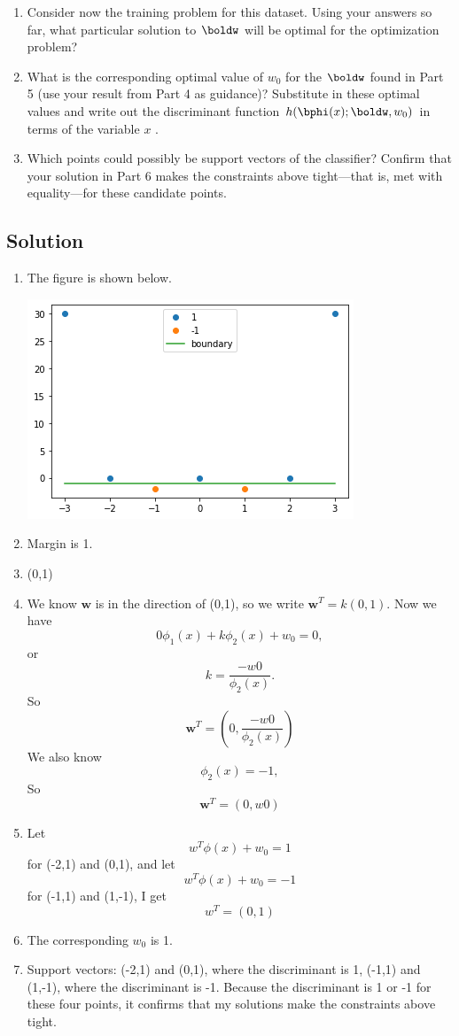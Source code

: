 \documentclass[submit]{harvardml}
\begin{document}
\begin{problem}
\begin{enumerate}
\item Consider now the training problem for this dataset. Using your
  answers so far, what particular solution to $\boldw$ will be optimal
  for the optimization problem?

\item What is the corresponding optimal value of $w_0$ for the
  $\boldw$ found in Part 5 (use your result from Part 4 as guidance)?
  Substitute in these optimal values and write out the discriminant
  function $h(\bphi(x);\boldw,w_0)$ in terms of the variable $x$ .


\item Which points could possibly be support vectors of the classifier?  Confirm that
  your solution in Part 6 makes the constraints above tight---that is,
  met with equality---for these candidate points.

\end{enumerate}

\end{problem}


\newpage
\subsection*{Solution}
\begin{enumerate}
    \item 
    The figure is shown below.
    \begin{center}
    \includegraphics[width=.5\textwidth]{T1_1.png}
    \end{center}
    \item
    Margin is 1.
    \item
    (0,1)
    \item
    We know $\textbf{w}$ is in the direction of (0,1), so we write $\textbf{w}^T=k(0,1)$. Now we have
    $$0\phi_1(x)+k\phi_2(x)+w_0=0,$$
    or
    $$k=\frac{-w0}{\phi_2(x)}.$$
    So 
    $$\textbf{w}^T=(0,\frac{-w0}{\phi_2(x)})$$
    We also know
    $$\phi_2(x)=-1,$$
    So 
    $$\textbf{w}^T=(0,w0)$$
    \item
    Let 
    $${w}^T\phi(x)+w_0=1$$
    for (-2,1) and (0,1), and let
    $${w}^T\phi(x)+w_0=-1$$
    for (-1,1) and (1,-1),
    I get 
    $${w}^T=(0,1)$$
    \item
    The corresponding $w_0$ is 1.
    \item
    Support vectors: (-2,1) and (0,1), where the discriminant is 1, (-1,1) and (1,-1), where the discriminant is -1. Because the discriminant is 1 or -1 for these four points, it confirms that my solutions make the constraints above tight.
\end{enumerate}
\end{document}
